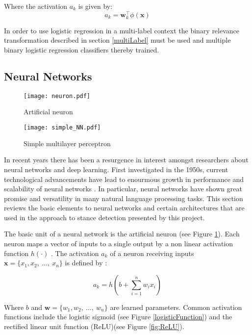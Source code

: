 \documentclass[Dissertation.tex]{subfiles}
\begin{document}
Where the activation $ a_k $ is given by:
 \[a_k =  \mathbf{w}_k^\top\phi(\mathbf{x})  \]
 
In order to use logistic regression in a multi-label context the binary relevance transformation described in section \ref{multiLabel} must be used and multiple binary logistic regression classifiers thereby trained.

\subsection{Neural Networks}
\begin{figure}[h]

	\centering
	\texttt{[image: neuron.pdf]}

	\caption{Artificial neuron}
	\label{fig:neuron}
\end{figure}

\begin{figure}
	\centering
	\texttt{[image: simple\_NN.pdf]}
	\caption{Simple multilayer perceptron}
	\label{fig:multilayerPercep}
\end{figure}

In recent years there has been a resurgence in interest amongst researchers about neural networks and deep learning. First investigated in the 1950s, current technological advancements have lead to enourmous growth in performance and scalability of neural networks \cite{pattersonDeepLearningPractitioner2017}. In particular, neural networks have shown great promise and versatility in many natural language processing tasks. This section reviews the basic elements to neural networks and certain architectures that are used in the approach to stance detection presented by this project. 

The basic unit of a neural network is the artificial neuron (see Figure \ref{fig:neuron}). Each neuron maps a vector of inputs to a single output by a non linear activation function $ h(\cdot) $ \cite{pattersonDeepLearningPractitioner2017}. The activation $ a_k $ of a neuron receiving inputs $ \mathbf{x} = \{x_1,x_2,\ \dots,\ x_n\} $ is defined by \cite{pattersonDeepLearningPractitioner2017}:

\[ a_k = h(b + \sum_{i=1}^n w_ix_i) \]

Where $ b $ and $ \mathbf{w} = \{w_1,w_2, \ \dots, \ w_n\} $ are learned parameters. Common activation functions include the logistic sigmoid (see Figure \ref{logisticFunction}) and the rectified linear unit function (ReLU)(see Figure \ref{fig:ReLU}).
\end{document}
